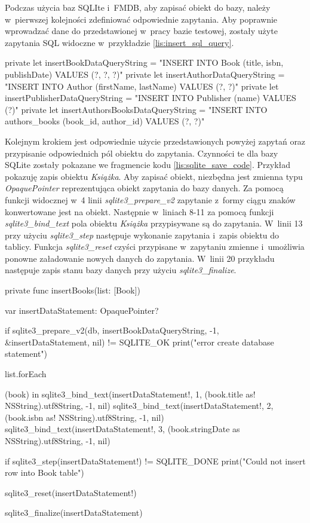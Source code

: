Podczas użycia baz SQLIte i~FMDB, aby zapisać obiekt do bazy, należy w~pierwszej kolejności zdefiniować odpowiednie zapytania. Aby poprawnie wprowadzać dane do przedstawionej w~pracy bazie testowej, zostały użyte zapytania SQL widoczne w~przykładzie \ref{lis:insert_sql_query}. 

\begin{code}[
		language=swift,
		caption={Zapytania SQL do wprowadzania danych},
		label={lis:insert_sql_query},
	]
    private let insertBookDataQueryString = "INSERT INTO Book (title, isbn, publishDate) VALUES (?, ?, ?)"
    private let insertAuthorDataQueryString = "INSERT INTO Author (firstName, lastName) VALUES (?, ?)"
    private let insertPublisherDataQueryString = "INSERT INTO Publisher (name) VALUES (?)"
    private let insertAuthorsBooksDataQueryString = "INSERT INTO authors_books (book_id, author_id) VALUES (?, ?)"
\end{code}
\bigskip

Kolejnym krokiem jest odpowiednie użycie przedstawionych powyżej zapytań oraz przypisanie odpowiednich pól obiektu do zapytania. Czynności te dla bazy SQLite zostały pokazane we fragmencie kodu \ref{lis:sqlite_save_code}. Przykład pokazuję zapis obiektu \textit{Książka}. Aby zapisać obiekt, niezbędna jest zmienna typu \textit{OpaquePointer} reprezentująca obiekt zapytania do bazy danych. Za pomocą funkcji widocznej w~4 linii \textit{sqlite3\_prepare\_v2} zapytanie z~formy ciągu znaków konwertowane jest na obiekt. Następnie w~liniach 8-11 za pomocą funkcji \textit{sqlite3\_bind\_text} pola obiektu \textit{Książka} przypisywane są do zapytania. W~linii 13 przy użyciu \textit{sqlite3\_step} następuje wykonanie zapytania i~zapis obiektu do tablicy. Funkcja \textit{sqlite3\_reset} czyści przypisane w~zapytaniu zmienne i~umożliwia ponowne załadowanie nowych danych do zapytania. W~linii 20 przykładu następuje zapis stanu bazy danych przy użyciu \textit{sqlite3\_finalize}.

\begin{code}[
		language=swift,
		caption={Przykład zapisu obiektu SQLIte},
		label={lis:sqlite_save_code},
	]
    private func insertBooks(list: [Book]) {
        var insertDataStatement: OpaquePointer?
        
        if sqlite3_prepare_v2(db, insertBookDataQueryString, -1, &insertDataStatement, nil) != SQLITE_OK {
            print("error create database statement")
        }
        
        list.forEach { (book) in
            sqlite3_bind_text(insertDataStatement!, 1, (book.title as! NSString).utf8String, -1, nil)
            sqlite3_bind_text(insertDataStatement!, 2, (book.isbn as! NSString).utf8String, -1, nil)
            sqlite3_bind_text(insertDataStatement!, 3, (book.stringDate as NSString).utf8String, -1, nil)
            
            if sqlite3_step(insertDataStatement!) != SQLITE_DONE {
                print("Could not insert row into Book table")
            }
            
            sqlite3_reset(insertDataStatement!)
        }
        
        sqlite3_finalize(insertDataStatement)
    }
\end{code}
\bigskip

